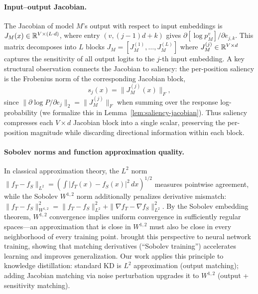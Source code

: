 \paragraph{Input--output Jacobian.}
The Jacobian of model $M$'s output with respect to input embeddings is $J_M(x) \in \mathbb{R}^{V \times (L \cdot d)}$, where entry $(v, (j{-}1)d + k)$ gives $\partial [\log p_M^v] / \partial e_{j,k}$.
This matrix decomposes into $L$ blocks $J_M = [J_M^{(1)}, \ldots, J_M^{(L)}]$ where $J_M^{(j)} \in \mathbb{R}^{V \times d}$ captures the sensitivity of all output logits to the $j$-th input embedding.
A key structural observation connects the Jacobian to saliency: the per-position saliency is the Frobenius norm of the corresponding Jacobian block,
\begin{equation}\label{eq:saliency-jacobian}
  s_j(x) = \|J_M^{(j)}(x)\|_F,
\end{equation}
since $\|\partial \log P / \partial e_j\|_2 = \|J_M^{(j)}\|_F$ when summing over the response log-probability (we formalize this in Lemma~\ref{lem:saliency-jacobian}).
Thus saliency compresses each $V \times d$ Jacobian block into a single scalar, preserving the per-position magnitude while discarding directional information within each block.

\paragraph{Sobolev norms and function approximation quality.}
In classical approximation theory, the $L^2$ norm $\|f_T - f_S\|_{L^2} = (\int |f_T(x) - f_S(x)|^2 \, dx)^{1/2}$ measures pointwise agreement, while the Sobolev $W^{1,2}$ norm additionally penalizes derivative mismatch:
$\|f_T - f_S\|_{W^{1,2}}^2 = \|f_T - f_S\|_{L^2}^2 + \|\nabla f_T - \nabla f_S\|_{L^2}^2$.
By the Sobolev embedding theorem, $W^{1,2}$ convergence implies uniform convergence in sufficiently regular spaces---an approximation that is close in $W^{1,2}$ must also be close in every neighborhood of every training point.
\citet{czarnecki2017sobolev} brought this perspective to neural network training, showing that matching derivatives (``Sobolev training'') accelerates learning and improves generalization.
Our work applies this principle to knowledge distillation: standard KD is $L^2$ approximation (output matching); adding Jacobian matching via noise perturbation upgrades it to $W^{1,2}$ (output + sensitivity matching).

